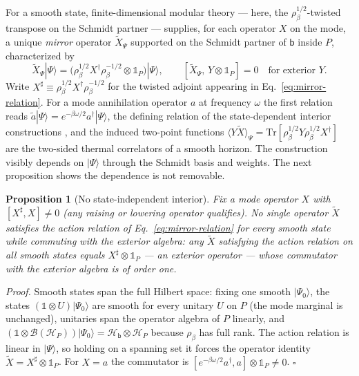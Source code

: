 \documentclass[12pt]{article}
\newcommand{\Tr}{\mathrm{Tr}}
\newcommand{\ket}[1]{|#1\rangle}
\newtheorem{proposition}{Proposition}
\begin{document}
For a smooth state, finite-dimensional modular theory --- here, the
$\rho_\beta^{1/2}$-twisted transpose on the Schmidt partner --- supplies, for
each operator $X$ on the mode, a unique \emph{mirror} operator
$\widetilde X_\Psi$ supported on the Schmidt partner of $\mathsf b$ inside
$P$, characterized by
\begin{equation}
    \widetilde X_\Psi\ket\Psi
    =
    \big(\rho_\beta^{1/2}X^\dagger\rho_\beta^{-1/2}\otimes
    \mathbb 1_P\big)\ket\Psi,
    \qquad
    [\widetilde X_\Psi,\,Y\otimes\mathbb 1_P]=0
    \quad\text{for exterior }Y.
\label{eq:mirror-relation}
\end{equation}
Write $X^\sharp\equiv\rho_\beta^{1/2}X^\dagger\rho_\beta^{-1/2}$ for the
twisted adjoint appearing in Eq.~\eqref{eq:mirror-relation}.  For a mode
annihilation operator $a$ at frequency $\omega$ the first relation
reads $\tilde a\ket\Psi=e^{-\beta\omega/2}a^\dagger\ket\Psi$, the defining
relation of the state-dependent interior constructions
\cite{PapadodimasRaju2013,PapadodimasRaju2014}, and the induced two-point
functions $\langle Y\widetilde X\rangle_\Psi
=\Tr[\rho_\beta^{1/2}Y\rho_\beta^{1/2}X^\dagger]$ are the two-sided thermal
correlators of a smooth horizon.  The construction visibly depends on
$\ket\Psi$ through the Schmidt basis and weights.  The next proposition shows
the dependence is not removable.

\begin{proposition}[No state-independent interior]
\label{prop:no-go}
Fix a mode operator $X$ with $[X^\sharp,X]\neq0$ (any raising or
lowering operator qualifies).  No single operator $\widetilde X$ satisfies
the action relation of Eq.~\eqref{eq:mirror-relation} for every smooth state
while commuting with the exterior algebra: any $\widetilde X$ satisfying the
action relation on all smooth states equals
$X^\sharp\otimes\mathbb 1_P$ --- an exterior operator --- whose commutator
with the exterior algebra is of order one.
\end{proposition}

\emph{Proof.}  Smooth states span the full Hilbert space: fixing one smooth
$\ket{\Psi_0}$, the states $(\mathbb 1\otimes U)\ket{\Psi_0}$ are smooth for
every unitary $U$ on $P$ (the mode marginal is unchanged), unitaries span
the operator algebra of $P$ linearly, and
$(\mathbb 1\otimes\mathcal B(\mathcal H_P))\ket{\Psi_0}
=\mathcal H_{\mathsf b}\otimes\mathcal H_P$ because $\rho_\beta$ has full
rank.  The action relation is linear in $\ket\Psi$, so holding on a spanning
set it forces the operator identity
$\widetilde X=X^\sharp\otimes\mathbb 1_P$.
For $X=a$ the commutator is
$[e^{-\beta\omega/2}a^\dagger,a]\otimes\mathbb 1_P\neq0$.  \hfill$\square$
\end{document}

